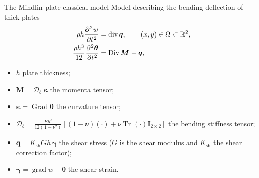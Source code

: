 \documentclass[aspectratio=169]{ISAE-Beamer}
\DeclareMathOperator*{\grad}{grad}
\DeclareMathOperator*{\Grad}{Grad}
\DeclareMathOperator*{\Div}{Div}
\renewcommand{\div}{\operatorname{div}}
\DeclareMathOperator{\Tr}{Tr}
\newcommand{\bbR}{\mathbb{R}}
\begin{document}
\begin{frame}{The Mindlin plate classical model}
Model describing the bending deflection of thick plates
\begin{equation*}
\begin{aligned}
\rho h \diffp[2]{w}{t} &= \div \bm{q}, \qquad (x,y) \in \Omega \subset \bbR^2, \\
\frac{\rho h^3}{12} \diffp[2]{\bm{\theta}}{t} &=\Div \bm{M} + \bm{q},
\end{aligned}
\end{equation*}

\begin{itemize}
	\item $h$ plate thickness;
	\item $\bm{M}= \bm{\mathcal{D}}_b\,\bm{\kappa}$ the momenta tensor;
	\item  $\bm{\kappa} = \Grad{\bm{\theta}}$ the curvature tensor;
	\item $\bm{\mathcal{D}}_{b} = \frac{E h^3}{12(1-\nu^2)} \left[ (1-\nu) (\cdot) + \nu \Tr(\cdot) \bm{I}_{2\times 2} \right]$ the bending stiffness tensor;
	\item $\bm{q}= K_{\text{sh}} Gh\,\bm{\gamma}$ the shear stress ($G$ is the shear modulus and $K_{\text{sh}}$ the shear correction factor);
	\item $\bm{\gamma} = \grad w - \bm{\theta}$ the shear strain.
\end{itemize}

\end{frame}
\end{document}
